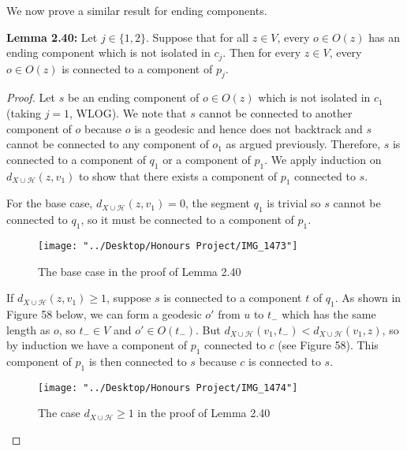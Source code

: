 \documentclass[12pt]{article}
\newcommand{\vs}{\vskip10pt}
\begin{document}
	We now prove a similar result for ending components. 
	
	\vs 
	
	\textbf{Lemma 2.40: } Let $j \in \{1,2\}$. Suppose that for all $z \in V$, every $o \in O(z)$ has an ending component which is not isolated in $c_j$. Then for every $z \in V$, every $o \in O(z)$ is connected to a component of $p_j$. 
	
	\begin{proof}
		
		Let $s$ be an ending component of $o \in O(z)$ which is not isolated in $c_1$ (taking $j = 1$, WLOG). We note that $s$ cannot be connected to another component of $o$ because $o$ is a geodesic and hence does not backtrack and $s$ cannot be connected to any component of $o_1$ as argued previously. Therefore, $s$ is connected to a component of $q_1$ or a component of $p_1$. We apply induction on $d_{X \cup \mathcal{H}} (z, v_1)$ to show that there exists a component of $p_1$ connected to $s$.
		
		\vs 
		
		For the base case, $d_{X \cup \mathcal{H}}(z, v_1) = 0$, the segment $q_1$ is trivial so $s$ cannot be connected to $q_1$, so it must be connected to a component of $p_1$. 
		
\begin{figure} [H]
	\centering
	\texttt{[image: "../Desktop/Honours Project/IMG\_1473"]}
	\caption{The base case in the proof of Lemma 2.40}
	\label{fig:img1473}
\end{figure}
		
		\vs 
		
		If $d_{X \cup \mathcal{H}}(z, v_1) \geq 1$, suppose $s$ is connected to a component $t$ of $q_1$. As shown in Figure 58 below, we can form a geodesic $o'$ from $u$ to $t_-$ which has the same length as $o$, so $t_- \in V$ and $o' \in O(t_-)$. But $d_{X \cup \mathcal{H}}(v_1, t_-) < d_{X \cup \mathcal{H}}(v_1, z)$, so by induction we have a component of $p_1$ connected to $c$ (see Figure 58). This component of $p_1$ is then connected to $s$ because $c$ is connected to $s$.
		
\begin{figure} [H]
	\centering
	\texttt{[image: "../Desktop/Honours Project/IMG\_1474"]}
	\caption{The case $d_{X \cup \mathcal{H}} \geq 1$ in the proof of Lemma 2.40}
	\label{fig:img1474}
\end{figure}
		
	\end{proof}
\end{document}
